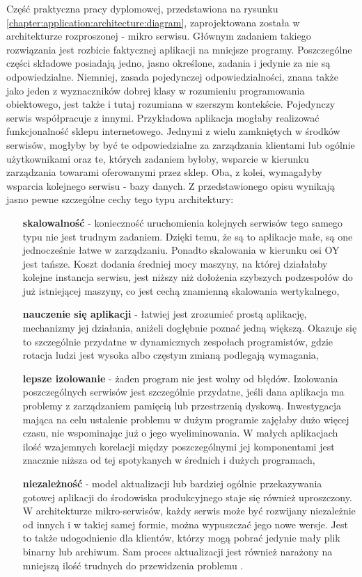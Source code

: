 Część praktyczna pracy dyplomowej, przedstawiona na rysunku \ref{chapter:application:architecture:diagram}, 
zaprojektowana została w architekturze rozproszonej - mikro serwisu. Głównym zadaniem takiego rozwiązania
jest rozbicie faktycznej aplikacji na mniejsze programy. Poszczególne części składowe posiadają jedno, 
jasno określone, zadania i jedynie za nie są odpowiedzialne. Niemniej, zasada pojedynczej odpowiedzialności, znana także jako
jeden z wyznaczników dobrej klasy w rozumieniu programowania obiektowego, jest także i tutaj rozumiana w szerszym
kontekście. Pojedynczy serwis współpracuje z innymi. Przykładowa aplikacja mogłaby realizować funkcjonalność 
sklepu internetowego. Jednymi z wielu zamkniętych w środków serwisów, mogłyby by być te odpowiedzialne za zarządzania
klientami lub ogólnie użytkownikami oraz te, których zadaniem byłoby, wsparcie w kierunku zarządzania towarami oferowanymi
przez sklep. Oba, z kolei, wymagałyby wsparcia kolejnego serwisu - bazy danych. Z przedstawionego opisu wynikają jasno pewne
szczególne cechy tego typu architektury:
\begin{itemize}
    \item[\textbf{skalowalność}] - konieczność uruchomienia kolejnych serwisów tego samego typu nie jest trudnym zadaniem. Dzięki temu, 
    że są to aplikacje małe, są one jednocześnie łatwe w zarządzaniu. Ponadto skalowania w kierunku osi OY jest tańsze. Koszt
    dodania średniej mocy maszyny, na której działałaby kolejne instancja serwisu, jest niższy niż dołożenia szybszych podzespołów
    do już istniejącej maszyny, co jest cechą znamienną skalowania wertykalnego,
    \item[\textbf{nauczenie się aplikacji}] - łatwiej jest zrozumieć prostą aplikację, mechanizmy jej działania, aniżeli dogłębnie poznać
    jedną większą. Okazuje się to szczególnie przydatne w dynamicznych zespołach programistów, gdzie rotacja ludzi jest wysoka albo
    częstym zmianą podlegają wymagania,
    \item[\textbf{lepsze izolowanie}] - żaden program nie jest wolny od błędów. Izolowania poszczególnych serwisów jest szczególnie
    przydatne, jeśli dana aplikacja ma problemy z zarządzaniem pamięcią lub przestrzenią dyskową. Inwestygacja mająca 
    na celu ustalenie problemu w dużym programie zajęłaby dużo więcej czasu, nie wspominając już o jego wyeliminowania. 
    W małych aplikacjach ilość wzajemnych korelacji między poszczególnymi jej komponentami jest znacznie niższa od tej
    spotykanych w średnich i dużych programach,
    \item[\textbf{niezależność}] - model aktualizacji lub bardziej ogólnie przekazywania gotowej aplikacji do środowiska produkcyjnego
    staje się również uproszczony. W architekturze mikro-serwisów, każdy serwis może być rozwijany niezależnie od innych i 
    w takiej samej formie, można wypuszczać jego nowe wersje. Jest to także udogodnienie dla klientów, którzy mogą
    pobrać jedynie mały plik binarny lub archiwum. Sam proces aktualizacji jest również narażony na mniejszą ilość
    trudnych do przewidzenia problemu \cite{microservice_architecture}. 
\end{itemize}

